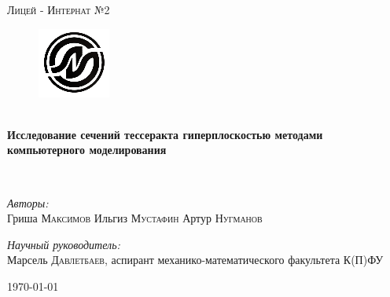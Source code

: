 \begin{titlepage}
\begin{center}
\textsc{\LARGE Лицей - Интернат №2}\\[1.5cm]

\begin{figure}
	\center
	\includegraphics[scale=0.8]{./li.png}
	\clearpage
\end{figure}


\selectfont
\HRule \\[0.4cm]
{ \huge \bfseries Исследование сечений тессеракта гиперплоскостью методами компьютерного моделирования\\[0.4cm] }

\HRule \\[1.5cm]

\noindent

\begin{minipage}{0.4\textwidth}
\begin{flushleft} \large
\emph{Авторы:}\\
Гриша \textsc{Максимов} \newline 
Ильгиз \textsc{Мустафин} \newline
Артур \textsc{Нугманов} 
\end{flushleft}

\end{minipage}%
\begin{minipage}{0.4\textwidth}
\begin{flushright} \large
\emph{Научный руководитель:} \\
Марсель \textsc{Давлетбаев}, аспирант механико-математического факультета К(П)ФУ
\end{flushright}
\end{minipage}

\vfill

{\large \today}

\end{center}
\end{titlepage}
